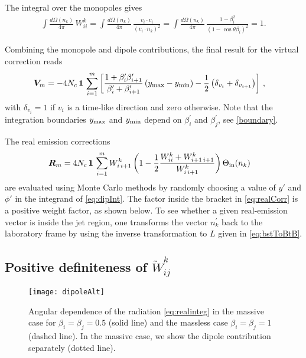 \documentclass[11pt,a4paper]{article}
\begin{document}
The integral over the monopoles gives
\begin{align}
\int\frac{d\Omega(n_k)}{4\pi}\, W_{ii}^k =\int\frac{d\Omega(n_k)}{4\pi}\, \frac{v_i\cdot v_i}{(v_i\cdot n_k)^2} =\int\frac{d\Omega(n_k)}{4\pi}\, \frac{1-\beta_i^2}{\left(1 - \cos \theta \beta_i\right)^2} =1.
\label{eq:monoInt}
\end{align}


Combining the monopole and dipole contributions, the final result for the virtual correction reads 
\begin{align} 
\bm{V}_m  &= - 4 N_c \,\bm{1}\,\sum_{i=1}^{m} \left[
\frac{1 + \beta^\prime_i \beta^\prime_{i+1}}{\beta^\prime_i + \beta^\prime_{i+1} }\left(y_{\rm max}-y_{\rm min}\right) -\frac{1}{2}\left(\delta_{v_i}+\delta_{v_{i+1}}\right)\right] \, , \label{eq:virtCorr} 
\end{align}
with $\delta_{v_{i}}=1$ if $v_i$ is a time-like direction and zero otherwise. Note that the integration boundaries $y_{\rm max}$ and $y_{\rm min}$ depend on $\beta^\prime_i $ and $\beta^\prime_j$, see \eqref{boundary}.

The real emission corrections
\begin{align}
\bm{R}_m & = 4 N_c \,\bm{1}\,\sum_{i=1}^{m}  W_{i\,i+1}^k \left(1 -\frac{1}{2}\frac{W_{ii}^k+W_{i+1\,i+1}^k}{W_{i\,i+1}^k}\right) \Theta_{\rm in}(n_{k}) \label{eq:realCorr}
\end{align}
are evaluated using Monte Carlo methods by randomly choosing a value of $y'$ and $\phi'$ in the integrand of \eqref{eq:dipInt}. The factor inside the bracket in \eqref{eq:realCorr} is a positive weight factor, as shown below. To see whether a given real-emission vector is inside the jet region, one  transforms the vector $n^\prime_k$ back to the laboratory frame by using the inverse transformation to $L$ given in \eqref{eq:bstToBtB}.




\subsection{Positive definiteness of $\widetilde{W}_{ij}^k$}\label{sec:posDef}
\begin{figure}[t]
	\centering
	\texttt{[image: dipoleAlt]}	
	\caption{Angular dependence of the radiation \eqref{eq:realinteg} in the massive case for $\beta_i=\beta_j=0.5$ (solid line) and the massless case $\beta_i=\beta_j=1$ (dashed line). In the massive case, we show the dipole contribution separately (dotted line).\label{fig:dipole}}
\end{figure}
\end{document}
